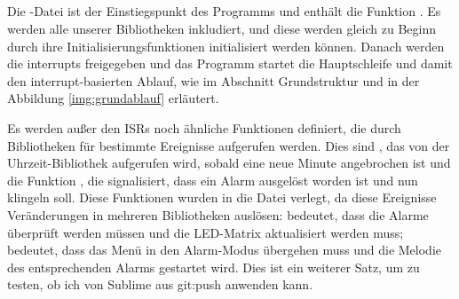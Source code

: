 \subsection{}
Die -Datei ist der Einstiegspunkt des Programms und enthält die Funktion . Es werden alle unserer Bibliotheken inkludiert, und diese werden gleich zu Beginn durch ihre Initialisierungsfunktionen initialisiert werden können. Danach werden die interrupts freigegeben und das Programm startet die Hauptschleife und damit den interrupt-basierten Ablauf, wie im Abschnitt Grundstruktur und in der Abbildung \ref{img:grundablauf} erläutert.
\newline


Es werden außer den ISRs noch ähnliche Funktionen definiert, die durch Bibliotheken für bestimmte Ereignisse aufgerufen werden. Dies sind , das von der Uhrzeit-Bibliothek aufgerufen wird, sobald eine neue Minute angebrochen ist und die Funktion , die signalisiert, dass ein Alarm ausgelöst worden ist und nun klingeln soll. Diese Funktionen wurden in die  Datei verlegt, da diese Ereignisse Veränderungen in mehreren Bibliotheken auslösen:  bedeutet, dass die Alarme überprüft werden müssen und die LED-Matrix aktualisiert werden muss;
 bedeutet, dass das Menü in den Alarm-Modus übergehen muss und die Melodie des entsprechenden Alarms gestartet wird.
Dies ist ein weiterer Satz, um zu testen, ob ich von Sublime aus git:push anwenden kann.